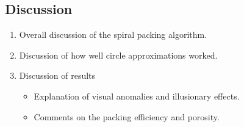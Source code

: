 \documentclass[11pt, oneside]{article}   	%
\begin{document}
\subsection*{Discussion}
\begin{enumerate}
	\item Overall discussion of the spiral packing algorithm.
	\item Discussion of how well circle approximations worked.
	\item Discussion of results
	\begin{itemize}
		\item Explanation of visual anomalies and illusionary effects.
		\item Comments on the packing efficiency and porosity.
	\end{itemize}
\end{enumerate}
\end{document}
